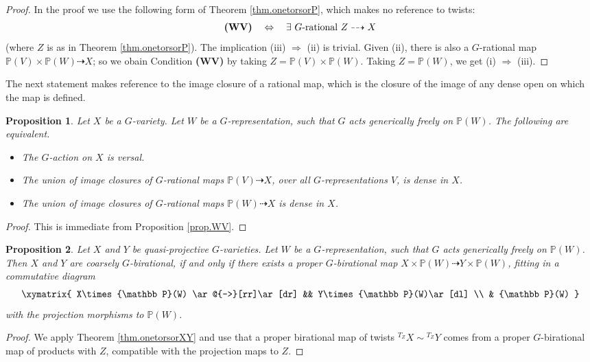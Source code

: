 \documentclass[12pt, reqno]{amsart}
\numberwithin{equation}{section}
\theoremstyle{plain}
\newtheorem{prop}{Proposition}[section]
\theoremstyle{definition}
\def\bP{{\mathbb P}}
\begin{document}
\begin{proof}
In the proof we use the following form of Theorem \ref{thm.onetorsorP}, which makes no reference to twists:
\[ \text{\textbf{(WV)}}\quad \Leftrightarrow \quad \exists\text{ $G$-rational }Z\dashrightarrow X \]
(where $Z$ is as in Theorem \ref{thm.onetorsorP}).
The implication (iii) $\Rightarrow$ (ii) is trivial.
Given (ii), there is also a $G$-rational map $\bP(V)\times \bP(W)\dashrightarrow X$; so we obain Condition \textbf{(WV)} by taking $Z=\bP(V)\times \bP(W)$.
Taking $Z=\bP(W)$, we get
(i) $\Rightarrow$ (iii).
\end{proof}




The next statement makes reference to the image closure of a rational map, which is the closure of the image of any dense open on which the map is defined.

\begin{prop}
\label{prop.V}
Let $X$ be a $G$-variety.
Let $W$ be a $G$-representation, such that $G$ acts generically freely on $\bP(W)$.
The following are equivalent.
\begin{itemize}
\item[(i)] The $G$-action on $X$ is versal.
\item[(ii)] The union of image closures of $G$-rational maps $\bP(V)\dashrightarrow X$, over all
$G$-representations $V$, is dense in $X$.
\item[(iii)] The union of image closures of $G$-rational maps $\bP(W)\dashrightarrow X$ is dense in $X$.
\end{itemize}
\end{prop}

\begin{proof}
This is immediate from Proposition \ref{prop.WV}.
\end{proof}

\begin{prop}
\label{prop.coarselybirational}
Let $X$ and $Y$ be quasi-projective $G$-varieties.
Let $W$ be a $G$-representation, such that $G$ acts generically freely on $\bP(W)$.
Then $X$ and $Y$ are coarsely $G$-birational,
if and only if there exists a proper $G$-birational map $X\times \bP(W)\dashrightarrow Y\times \bP(W)$, fitting in a commutative diagram
\[
\xymatrix{
X\times \bP(W) \ar@{-->}[rr]\ar[dr] && Y\times \bP(W)\ar[dl] \\
& \bP(W)
}
\]
with the projection morphisms to $\bP(W)$.
\end{prop}

\begin{proof}
We apply Theorem \ref{thm.onetorsorXY} and use that a proper birational map of twists ${}^{T_Z}X\sim {}^{T_Z}Y$ comes from a proper $G$-birational map of products with $Z$, compatible with the projection maps to $Z$.
\end{proof}
\end{document}
